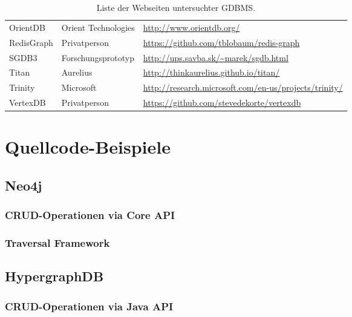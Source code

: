 \begin{table}[h]
\begin{footnotesize}
\begin{tabular}{|m{2.5cm}|m{3.5cm}|>{\arraybackslash}m{9.5cm}|}
   	OrientDB 		& Orient Technologies 	& \url{http://www.orientdb.org/} \\
   	RedisGraph 		& Privatperson 			& \url{https://github.com/tblobaum/redis-graph} \\
   	SGDB3 			& Forschungsprototyp 	& \url{http://ups.savba.sk/~marek/sgdb.html} \\
   	Titan 			& Aurelius 				& \url{http://thinkaurelius.github.io/titan/} \\
   	Trinity 		& Microsoft 			& \url{http://research.microsoft.com/en-us/projects/trinity/} \\
   	VertexDB 		& Privatperson 			& \url{https://github.com/stevedekorte/vertexdb} \\
   	\hline
   	\end{tabular} 
	\end{footnotesize}
	\setlength{\belowcaptionskip}{0.25cm}	
	\caption[GDBMS-Hersteller]{Liste der Webseiten untersuchter GDBMS.}
	\label{tab:anh_urls}
\end{table}
\renewcommand{\arraystretch}{1}

\section{Quellcode-Beispiele}

\subsection{Neo4j}

\subsubsection{CRUD-Operationen via Core API}
\label{anh:neo4j_native_api}

\subsubsection{Traversal Framework}
\label{anh:neo4j_traversal_framework}

\subsection{HypergraphDB}

\subsubsection{CRUD-Operationen via Java API}

